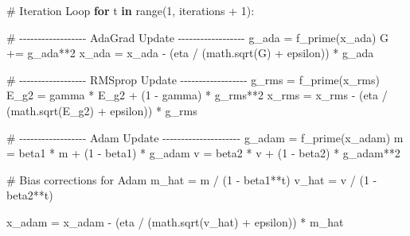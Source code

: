 \documentclass[
  letterpaper,
  DIV=11,
  numbers=noendperiod]{scrreprt}
\newenvironment{Shaded}{\begin{snugshade}}{\end{snugshade}}
\newcommand{\BuiltInTok}[1]{\textcolor[rgb]{0.00,0.23,0.31}{#1}}
\newcommand{\CommentTok}[1]{\textcolor[rgb]{0.37,0.37,0.37}{#1}}
\newcommand{\ControlFlowTok}[1]{\textcolor[rgb]{0.00,0.23,0.31}{\textbf{#1}}}
\newcommand{\DecValTok}[1]{\textcolor[rgb]{0.68,0.00,0.00}{#1}}
\newcommand{\KeywordTok}[1]{\textcolor[rgb]{0.00,0.23,0.31}{\textbf{#1}}}
\newcommand{\NormalTok}[1]{\textcolor[rgb]{0.00,0.23,0.31}{#1}}
\newcommand{\OperatorTok}[1]{\textcolor[rgb]{0.37,0.37,0.37}{#1}}
\begin{document}
\begin{Shaded}
\begin{Highlighting}[]
\CommentTok{\# Iteration Loop}
\ControlFlowTok{for}\NormalTok{ t }\KeywordTok{in} \BuiltInTok{range}\NormalTok{(}\DecValTok{1}\NormalTok{, iterations }\OperatorTok{+} \DecValTok{1}\NormalTok{):}
    
    \CommentTok{\# {-}{-}{-}{-}{-}{-}{-}{-}{-}{-}{-}{-}{-}{-}{-}{-}{-}{-} AdaGrad Update {-}{-}{-}{-}{-}{-}{-}{-}{-}{-}{-}{-}{-}{-}{-}{-}{-}{-}}
\NormalTok{    g\_ada }\OperatorTok{=}\NormalTok{ f\_prime(x\_ada)}
\NormalTok{    G }\OperatorTok{+=}\NormalTok{ g\_ada}\OperatorTok{**}\DecValTok{2}
\NormalTok{    x\_ada }\OperatorTok{=}\NormalTok{ x\_ada }\OperatorTok{{-}}\NormalTok{ (eta }\OperatorTok{/}\NormalTok{ (math.sqrt(G) }\OperatorTok{+}\NormalTok{ epsilon)) }\OperatorTok{*}\NormalTok{ g\_ada}
    
    \CommentTok{\# {-}{-}{-}{-}{-}{-}{-}{-}{-}{-}{-}{-}{-}{-}{-}{-}{-}{-} RMSprop Update {-}{-}{-}{-}{-}{-}{-}{-}{-}{-}{-}{-}{-}{-}{-}{-}{-}{-}}
\NormalTok{    g\_rms }\OperatorTok{=}\NormalTok{ f\_prime(x\_rms)}
\NormalTok{    E\_g2 }\OperatorTok{=}\NormalTok{ gamma }\OperatorTok{*}\NormalTok{ E\_g2 }\OperatorTok{+}\NormalTok{ (}\DecValTok{1} \OperatorTok{{-}}\NormalTok{ gamma) }\OperatorTok{*}\NormalTok{ g\_rms}\OperatorTok{**}\DecValTok{2}
\NormalTok{    x\_rms }\OperatorTok{=}\NormalTok{ x\_rms }\OperatorTok{{-}}\NormalTok{ (eta }\OperatorTok{/}\NormalTok{ (math.sqrt(E\_g2) }\OperatorTok{+}\NormalTok{ epsilon)) }\OperatorTok{*}\NormalTok{ g\_rms}
    
    \CommentTok{\# {-}{-}{-}{-}{-}{-}{-}{-}{-}{-}{-}{-}{-}{-}{-}{-}{-}{-} Adam Update {-}{-}{-}{-}{-}{-}{-}{-}{-}{-}{-}{-}{-}{-}{-}{-}{-}{-}{-}{-}{-}}
\NormalTok{    g\_adam }\OperatorTok{=}\NormalTok{ f\_prime(x\_adam)}
\NormalTok{    m }\OperatorTok{=}\NormalTok{ beta1 }\OperatorTok{*}\NormalTok{ m }\OperatorTok{+}\NormalTok{ (}\DecValTok{1} \OperatorTok{{-}}\NormalTok{ beta1) }\OperatorTok{*}\NormalTok{ g\_adam}
\NormalTok{    v }\OperatorTok{=}\NormalTok{ beta2 }\OperatorTok{*}\NormalTok{ v }\OperatorTok{+}\NormalTok{ (}\DecValTok{1} \OperatorTok{{-}}\NormalTok{ beta2) }\OperatorTok{*}\NormalTok{ g\_adam}\OperatorTok{**}\DecValTok{2}
    
    \CommentTok{\# Bias corrections for Adam}
\NormalTok{    m\_hat }\OperatorTok{=}\NormalTok{ m }\OperatorTok{/}\NormalTok{ (}\DecValTok{1} \OperatorTok{{-}}\NormalTok{ beta1}\OperatorTok{**}\NormalTok{t)}
\NormalTok{    v\_hat }\OperatorTok{=}\NormalTok{ v }\OperatorTok{/}\NormalTok{ (}\DecValTok{1} \OperatorTok{{-}}\NormalTok{ beta2}\OperatorTok{**}\NormalTok{t)}
    
\NormalTok{    x\_adam }\OperatorTok{=}\NormalTok{ x\_adam }\OperatorTok{{-}}\NormalTok{ (eta }\OperatorTok{/}\NormalTok{ (math.sqrt(v\_hat) }\OperatorTok{+}\NormalTok{ epsilon)) }\OperatorTok{*}\NormalTok{ m\_hat}
    

\end{Highlighting}
\end{Shaded}
\end{document}
